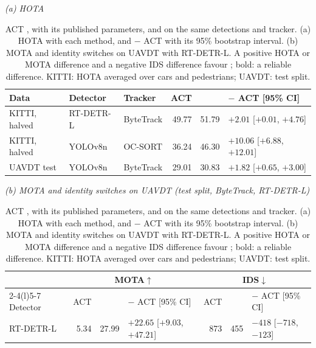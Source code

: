 \begin{table}[!tp]
\caption{ACT \cite{act2026adaptive}, with its published parameters, and \scl{} on the same detections and tracker. (a) HOTA with each method, and \scl{} $-$ ACT with its 95\% bootstrap interval. (b) MOTA and identity switches on UAVDT with RT-DETR-L. A positive HOTA or MOTA difference and a negative IDS difference favour \scl{}; bold: a reliable difference. KITTI: HOTA averaged over cars and pedestrians; UAVDT: test split.}
\label{tab:act}
\centering\footnotesize
\setlength{\tabcolsep}{3pt}
{\textit{(a) HOTA}}\par\smallskip
\begin{tabular}{@{}lllrrl@{}}
\toprule
Data & Detector & Tracker & ACT & \scl{} & \scl{} $-$ ACT [95\% CI]\\
\midrule
KITTI, halved & RT-DETR-L & ByteTrack & 49.77 & 51.79 & {\boldmath $+2.01$ [$+0.01$, $+4.76$]}\\
KITTI, halved & YOLOv8n & OC-SORT & 36.24 & 46.30 & {\boldmath $+10.06$ [$+6.88$, $+12.01$]}\\
\addlinespace[2pt]
UAVDT test & YOLOv8n & ByteTrack & 29.01 & 30.83 & {\boldmath $+1.82$ [$+0.65$, $+3.00$]}\\
\bottomrule
\end{tabular}

\medskip
{\textit{(b) MOTA and identity switches on UAVDT (test split, ByteTrack, RT-DETR-L)}}\par\smallskip
\begin{tabular}{@{}lrrlrrl@{}}
\toprule
 & \multicolumn{3}{c}{MOTA$\uparrow$} & \multicolumn{3}{c}{IDS$\downarrow$}\\
\cmidrule(lr){2-4}\cmidrule(l){5-7}
Detector & ACT & \scl{} & \scl{} $-$ ACT [95\% CI] & ACT & \scl{} & \scl{} $-$ ACT [95\% CI]\\
\midrule
RT-DETR-L & 5.34 & 27.99 & {\boldmath $+22.65$ [$+9.03$, $+47.21$]} & 873 & 455 & {\boldmath $-418$ [$-718$, $-123$]}\\
\bottomrule
\end{tabular}
\end{table}
